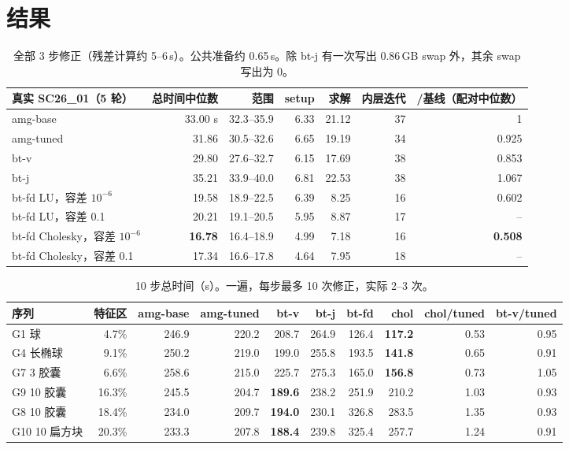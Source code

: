 \documentclass[11pt,a4paper]{ctexart}
\begin{document}
\section{结果}
\begin{table}[H]
\centering\small
\begin{tabular}{lrrrrrr}
\toprule
真实 SC26\_01（5 轮） & 总时间中位数 & 范围 & setup & 求解 & 内层迭代 & /基线（配对中位数）\\
\midrule
amg-base & 33.00 s & 32.3--35.9 & 6.33 & 21.12 & 37 & 1 \\
amg-tuned & 31.86 & 30.5--32.6 & 6.65 & 19.19 & 34 & 0.925 \\
bt-v & 29.80 & 27.6--32.7 & 6.15 & 17.69 & 38 & 0.853 \\
bt-j & 35.21 & 33.9--40.0 & 6.81 & 22.53 & 38 & 1.067 \\
bt-fd LU，容差 $10^{-6}$ & 19.58 & 18.9--22.5 & 6.39 & 8.25 & 16 & 0.602 \\
bt-fd LU，容差 0.1 & 20.21 & 19.1--20.5 & 5.95 & 8.87 & 17 & -- \\
bt-fd Cholesky，容差 $10^{-6}$ & \textbf{16.78} & 16.4--18.9 & 4.99 & 7.18 & 16 & \textbf{0.508} \\
bt-fd Cholesky，容差 0.1 & 17.34 & 16.6--17.8 & 4.64 & 7.95 & 18 & -- \\
\bottomrule
\end{tabular}
\caption{全部 3 步修正（残差计算约 5--6\,s）。公共准备约 0.65\,s。除 bt-j 有一次写出 0.86\,GB swap 外，其余 swap 写出为 0。}
\end{table}

\begin{table}[H]
\centering\footnotesize\setlength{\tabcolsep}{4pt}
\begin{tabular}{lrrrrrrrrr}
\toprule
序列 & 特征区 & amg-base & amg-tuned & bt-v & bt-j & bt-fd & chol & chol/tuned & bt-v/tuned \\
\midrule
G1 球 & 4.7\% & 246.9 & 220.2 & 208.7 & 264.9 & 126.4 & \textbf{117.2} & 0.53 & 0.95 \\
G4 长椭球 & 9.1\% & 250.2 & 219.0 & 199.0 & 255.8 & 193.5 & \textbf{141.8} & 0.65 & 0.91 \\
G7 3 胶囊 & 6.6\% & 258.6 & 215.0 & 225.7 & 275.3 & 165.0 & \textbf{156.8} & 0.73 & 1.05 \\
G9 10 胶囊 & 16.3\% & 245.5 & 204.7 & \textbf{189.6} & 238.2 & 251.9 & 210.2 & 1.03 & 0.93 \\
G8 10 胶囊 & 18.4\% & 234.0 & 209.7 & \textbf{194.0} & 230.1 & 326.8 & 283.5 & 1.35 & 0.93 \\
G10 10 扁方块 & 20.3\% & 233.3 & 207.8 & \textbf{188.4} & 239.8 & 325.4 & 257.7 & 1.24 & 0.91 \\
\bottomrule
\end{tabular}
\caption{10 步总时间（s）。一遍，每步最多 10 次修正，实际 2--3 次。}
\end{table}
\end{document}
